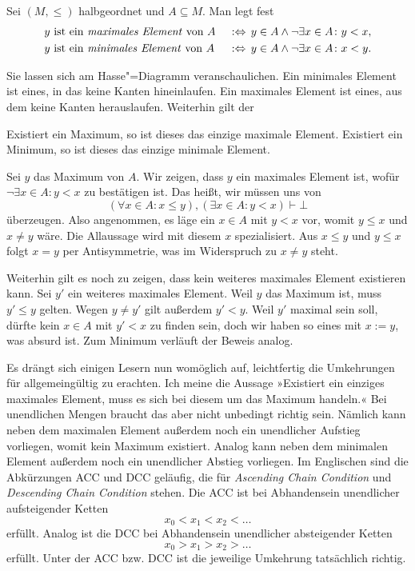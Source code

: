 \begin{Definition}%
\label{def:minimales-Element}\newlinefirst
Sei $(M,\le)$ halbgeordnet und $A\subseteq M$. Man legt fest
\begin{alignat*}{2}
&\text{$y$ ist ein \emph{maximales Element} von $A$}\,&&:\Leftrightarrow\,
  y\in A\land\lnot\exists x\in A\colon y<x,\\
&\text{$y$ ist ein \emph{minimales Element} von $A$}\,&&:\Leftrightarrow\,
  y\in A\land\lnot\exists x\in A\colon x<y.
\end{alignat*}
\end{Definition}

\noindent
Sie lassen sich am Hasse"=Diagramm veranschaulichen. Ein minimales
Element ist eines, in das keine Kanten hineinlaufen. Ein maximales
Element ist eines, aus dem keine Kanten herauslaufen. Weiterhin
gilt der

\begin{Satz}
Existiert ein Maximum, so ist dieses das einzige maximale Element.
Existiert ein Minimum, so ist dieses das einzige minimale Element.
\end{Satz}
\begin{Beweis}
Sei $y$ das Maximum von $A$. Wir zeigen, dass $y$ ein maximales
Element ist, wofür $\lnot\exists x\in A\colon y<x$ zu bestätigen ist.
Das heißt, wir müssen uns von
\[(\forall x\in A\colon x\le y),(\exists x\in A\colon y<x)\vdash\bot\]
überzeugen. Also angenommen, es läge ein $x\in A$ mit $y<x$ vor, womit
$y\le x$ und $x\ne y$ wäre. Die Allaussage wird mit diesem $x$
spezialisiert. Aus $x\le y$ und $y\le x$ folgt $x=y$ per Antisymmetrie,
was im Widerspruch zu $x\ne y$ steht.

Weiterhin gilt es noch zu zeigen, dass kein weiteres maximales
Element existieren kann. Sei $y'$ ein weiteres maximales Element.
Weil $y$ das Maximum ist, muss $y'\le y$ gelten. Wegen $y\ne y'$
gilt außerdem $y'<y$. Weil $y'$ maximal sein soll, dürfte kein $x\in A$
mit $y'<x$ zu finden sein, doch wir haben so eines mit $x:=y$, was
absurd ist. Zum Minimum verläuft der Beweis analog.\,\qedsymbol
\end{Beweis}

\noindent
Es drängt sich einigen Lesern nun womöglich auf, leichtfertig die
Umkehrungen für allgemeingültig zu erachten. Ich meine die Aussage
»Existiert ein einziges maximales Element, muss es sich bei diesem um
das Maximum handeln.« Bei unendlichen Mengen braucht das aber nicht
unbedingt richtig sein. Nämlich kann neben dem maximalen Element
außerdem noch ein unendlicher Aufstieg vorliegen, womit kein
Maximum existiert. Analog kann neben dem minimalen Element außerdem
noch ein unendlicher Abstieg vorliegen. Im Englischen sind die
Abkürzungen ACC und DCC geläufig, die für \emph{Ascending Chain Condition}
und \emph{Descending Chain Condition}
stehen. Die ACC ist bei Abhandensein unendlicher aufsteigender Ketten
\[x_0<x_1<x_2<\ldots\]
erfüllt. Analog ist die DCC bei Abhandensein unendlicher absteigender
Ketten
\[x_0>x_1>x_2>\ldots\]
erfüllt. Unter der ACC bzw. DCC ist die jeweilige Umkehrung tatsächlich
richtig.

